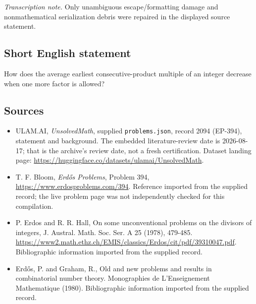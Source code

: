 \documentclass[11pt,a4paper]{article}
\begin{document}
{\small\emph{Transcription note.} Only unambiguous escape/formatting damage and nonmathematical serialization debris were repaired in the displayed source statement.}

\subsection{Short English statement}

How does the average earliest consecutive-product multiple of an integer decrease when one more factor is allowed?

\subsection{Sources}

{\small

\begin{itemize}

\item[\hypertarget{source:2094:1}{S1}] ULAM.AI, \emph{UnsolvedMath}, supplied \texttt{problems.json}, record 2094 (EP-394), statement and background. The embedded literature-review date is 2026-08-17; that is the archive’s review date, not a fresh certification. Dataset landing page: \url{https://huggingface.co/datasets/ulamai/UnsolvedMath}.

\item[\hypertarget{source:2094:2}{S2}] T. F. Bloom, \emph{Erdős Problems}, Problem 394, \url{https://www.erdosproblems.com/394}. Reference imported from the supplied record; the live problem page was not independently checked for this compilation.

\item[\hypertarget{source:2094:3}{S3}] P. Erdos and R. R. Hall, On some unconventional problems on the divisors of integers, J. Austral. Math. Soc. Ser. A 25 (1978), 479-485. \url{https://www2.math.ethz.ch/EMIS/classics/Erdos/cit/pdf/39310047.pdf}. Bibliographic information imported from the supplied record.

\item[\hypertarget{source:2094:4}{S4}] Erd\H{o}s, P. and Graham, R., Old and new problems and results in combinatorial number theory. Monographies de L'Enseignement Mathematique (1980). Bibliographic information imported from the supplied record.

\end{itemize}

}

\label{end:2094}
\end{document}
